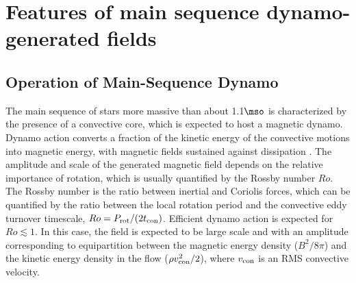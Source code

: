 \section{Features of main sequence dynamo-generated fields}

\subsection{Operation of Main-Sequence Dynamo}\label{msdynamo}

The main sequence of stars more massive than about 1.1$\mso$ is characterized by the presence of a convective core,
which is expected to host a magnetic dynamo. Dynamo action converts a fraction of the kinetic energy 
of the convective motions into magnetic energy, with magnetic fields sustained against dissipation  \citep[see e.g.,][]{Brandenburg_2005}. The amplitude and scale of the generated magnetic field depends on the relative importance of rotation, which is usually quantified by the Rossby number $Ro$. The Rossby number is the ratio between inertial and Coriolis forces, which can be quantified by the ratio between the local rotation period and the convective eddy turnover timescale, $Ro = P_{\rm rot}/(2 t_{\rm con})$. 
Efficient dynamo action is expected for $Ro \lesssim 1$. In this case, the field is expected to be large scale and with an amplitude corresponding to equipartition between the magnetic energy density ($B^2/8\pi$) and the kinetic energy density in the flow ($\rho v^2_{\rm con}/2$), where $v_{\rm con}$ is an RMS convective velocity.

